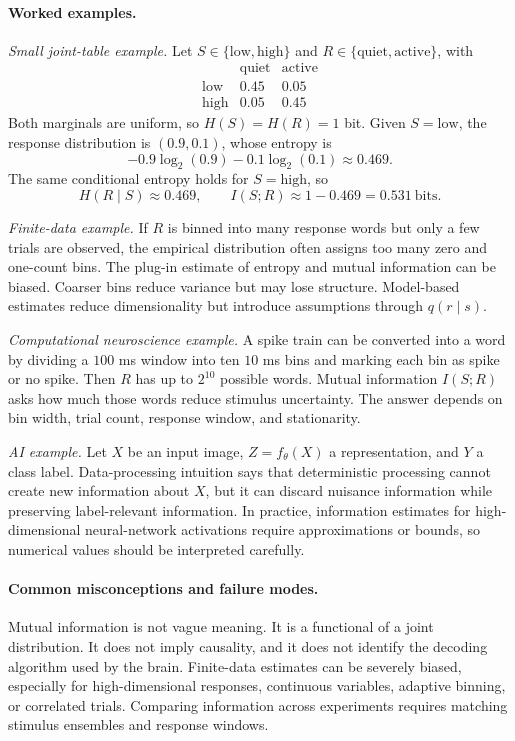 \paragraph{Worked examples.}
\emph{Small joint-table example.}
Let \(S\in\{\mathrm{low},\mathrm{high}\}\) and \(R\in\{\mathrm{quiet},\mathrm{active}\}\), with
\[
\begin{array}{c|cc}
 & \mathrm{quiet} & \mathrm{active}\\
\hline
\mathrm{low} & 0.45 & 0.05\\
\mathrm{high} & 0.05 & 0.45
\end{array}
\]
Both marginals are uniform, so \(H(S)=H(R)=1\) bit. Given \(S=\mathrm{low}\), the response distribution is \((0.9,0.1)\), whose entropy is
\[
-0.9\log_2(0.9)-0.1\log_2(0.1)\approx 0.469.
\]
The same conditional entropy holds for \(S=\mathrm{high}\), so
\[
H(R\mid S)\approx 0.469,\qquad
I(S;R)\approx 1-0.469=0.531\ \text{bits}.
\]

\emph{Finite-data example.}
If \(R\) is binned into many response words but only a few trials are observed, the empirical distribution often assigns too many zero and one-count bins. The plug-in estimate of entropy and mutual information can be biased. Coarser bins reduce variance but may lose structure. Model-based estimates reduce dimensionality but introduce assumptions through \(q(r\mid s)\).

\emph{Computational neuroscience example.}
A spike train can be converted into a word by dividing a \(100\) ms window into ten \(10\) ms bins and marking each bin as spike or no spike. Then \(R\) has up to \(2^{10}\) possible words. Mutual information \(I(S;R)\) asks how much those words reduce stimulus uncertainty. The answer depends on bin width, trial count, response window, and stationarity.

\emph{AI example.}
Let \(X\) be an input image, \(Z=f_\theta(X)\) a representation, and \(Y\) a class label. Data-processing intuition says that deterministic processing cannot create new information about \(X\), but it can discard nuisance information while preserving label-relevant information. In practice, information estimates for high-dimensional neural-network activations require approximations or bounds, so numerical values should be interpreted carefully.

\paragraph{Common misconceptions and failure modes.}
Mutual information is not vague meaning. It is a functional of a joint distribution. It does not imply causality, and it does not identify the decoding algorithm used by the brain. Finite-data estimates can be severely biased, especially for high-dimensional responses, continuous variables, adaptive binning, or correlated trials. Comparing information across experiments requires matching stimulus ensembles and response windows.

